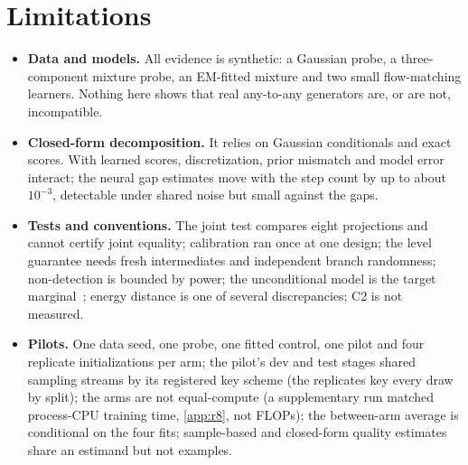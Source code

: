 \documentclass{article}
\theoremstyle{plain}
\theoremstyle{definition}
\theoremstyle{remark}
\begin{document}
\section{Limitations}
\label{sec:limits}
\begin{itemize}
\item \textbf{Data and models.} All evidence is synthetic: a Gaussian probe, a three-component mixture probe, an EM-fitted mixture and two small flow-matching learners. Nothing here shows that real any-to-any generators are, or are not, incompatible.
\item \textbf{Closed-form decomposition.} It relies on Gaussian conditionals and exact scores. With learned scores, discretization, prior mismatch and model error interact; the neural gap estimates move with the step count by up to about $10^{-3}$, detectable under shared noise but small against the gaps.
\item \textbf{Tests and conventions.} The joint test compares eight projections and cannot certify joint equality; calibration ran once at one design; the level guarantee needs fresh intermediates and independent branch randomness; non-detection is bounded by power; the unconditional model is the target marginal~\citep{bao2023unidiffuser}; energy distance is one of several discrepancies; C2 is not measured.
\item \textbf{Pilots.} One data seed, one probe, one fitted control, one pilot and four replicate initializations per arm; the pilot's dev and test stages shared sampling streams by its registered key scheme (the replicates key every draw by split); the arms are not equal-compute (a supplementary run matched process-CPU training time, \cref{app:r8}, not FLOPs); the between-arm average is conditional on the four fits; sample-based and closed-form quality estimates share an estimand but not examples.
\end{itemize}

\end{document}
